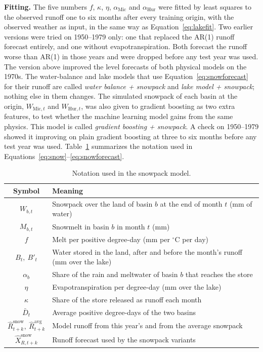 \documentclass{article}
\begin{document}
\textbf{Fitting.} The five numbers $f$, $\kappa$, $\eta$, $\alpha_{\mathrm{Mic}}$ and
$\alpha_{\mathrm{Hur}}$ were fitted by least squares to the observed runoff one to six months
after every training origin, with the observed weather as input, in the same way as
Equation~\ref{eq:lakefit}. Two earlier versions were tried on 1950--1979 only: one that replaced
the AR(1) runoff forecast entirely, and one without evapotranspiration. Both forecast the runoff
worse than AR(1) in those years and were dropped before any test year was used. The version above
improved the level forecasts of both physical models on the 1970s. The water-balance and lake
models that use Equation~\ref{eq:snowforecast} for their runoff are called \emph{water balance +
snowpack} and \emph{lake model + snowpack}; nothing else in them changes. The simulated snowpack
of each basin at the origin, $W_{\mathrm{Mic},t}$ and $W_{\mathrm{Hur},t}$, was also given to
gradient boosting as two extra features, to test whether the machine learning model gains from
the same physics. This model is called \emph{gradient boosting + snowpack}. A check on 1950--1979
showed it improving on plain gradient boosting at three to six months before any test year was
used.
Table~\ref{tab:notation-snow} summarizes the notation used in
Equations~\ref{eq:snow}--\ref{eq:snowforecast}.

\begin{table}[htbp]
\centering
\caption{Notation used in the snowpack model.}
\label{tab:notation-snow}
\begin{tabular}{||c|l||}
\hline\hline
Symbol & Meaning \\
\hline\hline
$W_{b,t}$ & Snowpack over the land of basin $b$ at the end of month $t$ (mm of water) \\
$M_{b,t}$ & Snowmelt in basin $b$ in month $t$ (mm) \\
$f$ & Melt per positive degree-day (mm per $^\circ$C per day) \\
$B_t,\ B'_t$ & Water stored in the land, after and before the month's runoff (mm over the lake) \\
$\alpha_b$ & Share of the rain and meltwater of basin $b$ that reaches the store \\
$\eta$ & Evapotranspiration per degree-day (mm over the lake) \\
$\kappa$ & Share of the store released as runoff each month \\
$\bar D_t$ & Average positive degree-days of the two basins \\
$\hat R^{\mathrm{snow}}_{t+k},\ \hat R^{\mathrm{avg}}_{t+k}$ & Model runoff from this year's and from the average snowpack \\
$\hat X^{\mathrm{snow}}_{R,t+k}$ & Runoff forecast used by the snowpack variants \\
\hline\hline
\end{tabular}
\end{table}
\end{document}
